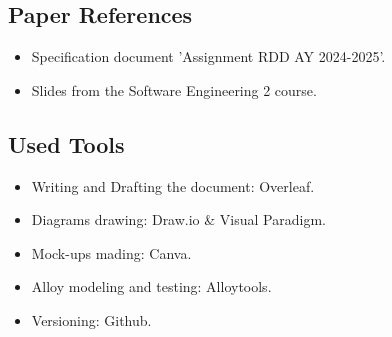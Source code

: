 \documentclass[12pt]{article}
\numberwithin{figure}{section}
\numberwithin{table}{section}
\begin{document}
\subsection{Paper References}
    \begin{itemize}
        \item Specification document 'Assignment RDD AY 2024-2025'.
        \item Slides from the Software Engineering 2 course.
    \end{itemize}
\subsection{Used Tools}
    \begin{itemize}
        \item Writing and Drafting the document: Overleaf.
        \item Diagrams drawing: Draw.io \& Visual Paradigm.
        \item Mock-ups mading: Canva.
        \item Alloy modeling and testing: Alloytools.
        \item Versioning: Github.
    \end{itemize}

\listoffigures
\newpage
\listoftables
\end{document}

